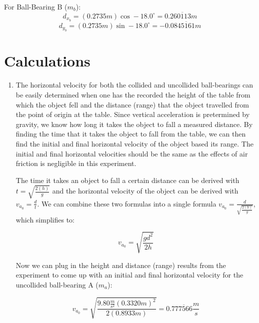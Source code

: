 \documentclass[12pt]{article}
\begin{document}
For Ball-Bearing B ($m_{b}$):
\begin{equation}
d_{x_{b}}=(0.2735m)\cos-18.0^{\circ}=0.260\overline{1}13m
\end{equation}
\begin{equation}
d_{y_{b}}=(0.2735m)\sin-18.0^{\circ}=-0.0845\overline{1}61m
\end{equation}

\pagebreak
\paragraph{}

\section{Calculations}
\begin{enumerate}
\item{
The horizontal velocity for both the collided and uncollided ball-bearings can be easily determined when one has the recorded the height of the table from which the object fell and the distance (range) that the object travelled from the point of origin at the table. Since vertical acceleration is pretermined by gravity, we know how long it takes the object to fall a measured distance. By finding the time that it takes the object to fall from the table, we can then find the initial and final horizontal velocity of the object based its range. The initial and final horizontal velocities should be the same as the effects of air friction is negligible in this experiment.

The time it takes an object to fall a certain distance can be derived with $t=\sqrt{\frac{2(h)}{g}}$ and the horizontal velocity of the object can be derived with $v_{a_{0}}=\frac{d}{t}$. We can combine these two formulas into a single formula $v_{a_{0}}=\frac{d}{\sqrt{\frac{2(h)}{g}}}$, which simplifies to:

\begin{equation}
v_{a_{0}}=\sqrt{\frac{gd^2}{2h}}
\end{equation}

Now we can plug in the height and distance (range) results from the experiment to come up with an initial and final horizontal velocity for the uncollided ball-bearing A ($m_{a}$):

\begin{equation}
v_{a_{0}}=\sqrt{\frac{9.80\frac{m}{s^2}(0.3320 m)^2}{2(0.8933 m)}}=0.777\overline{5}66\frac{m}{s}
\end{equation}}


\end{enumerate}
\end{document}
